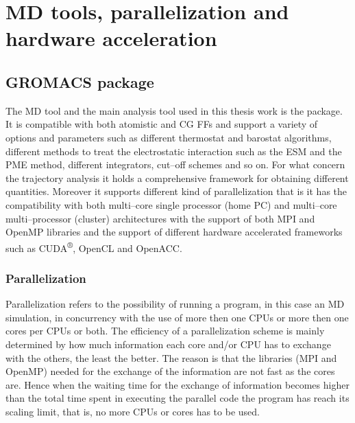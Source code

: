 \chapter{MD tools, parallelization and hardware acceleration}


\section{GROMACS package}
The \ac{MD} tool and the main analysis tool used in this thesis work is the \href{http://www.gromacs.org}{\gromacs}\cite{gromacsManual} package. It is compatible with both atomistic and \ac{CG} \acp{FF} and support a variety of options and parameters such as different thermostat and barostat algorithms, different methods to treat the electrostatic interaction such as the \ac{ESM} and the \ac{PME} method, different integrators, cut--off schemes and so on. For what concern the trajectory analysis it holds a comprehensive framework for obtaining different quantities. Moreover it supports different kind of parallelization that is it has the compatibility with both multi--core single processor (home PC) and multi--core multi--processor (cluster) architectures with the support of both MPI and OpenMP libraries and the support of different hardware accelerated frameworks such as CUDA\textsuperscript{®}, OpenCL and OpenACC.  

\subsection{Parallelization}
Parallelization refers to the possibility of running a program, in this case an \ac{MD} simulation, in concurrency with the use of more then one CPUs or more then one cores per CPUs or both. The efficiency of a parallelization scheme is mainly determined by how much information each core and/or CPU has to exchange with the others, the least the better. The reason is that the libraries (MPI and OpenMP) needed for the exchange of the information are not fast as the cores are. Hence when the waiting time for the exchange of information becomes higher than the total time spent in executing the parallel code the program has reach its scaling limit, that is, no more CPUs or cores has to be used.

